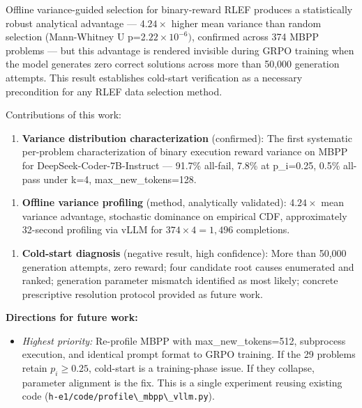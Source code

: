 
Offline variance-guided selection for binary-reward RLEF produces a statistically robust analytical advantage --- 4.$24\times$ higher mean variance than random selection (Mann-Whitney U p=2.$22\times 10^{-6})$, confirmed across 374 MBPP problems --- but this advantage is rendered invisible during GRPO training when the model generates zero correct solutions across more than 50,000 generation attempts. This result establishes cold-start verification as a necessary precondition for any RLEF data selection method.

Contributions of this work:

\begin{enumerate}
\item \textbf{Variance distribution characterization} (confirmed): The first systematic per-problem characterization of binary execution reward variance on MBPP for DeepSeek-Coder-7B-Instruct --- 91.7\% all-fail, 7.8\% at p\_i=0.25, 0.5\% all-pass under k=4, max\_new\_tokens=128.
\end{enumerate}

\begin{enumerate}
\item \textbf{Offline variance profiling} (method, analytically validated): 4.$24\times$ mean variance advantage, stochastic dominance on empirical CDF, approximately 32-second profiling via vLLM for $374\times 4=1,496$ completions.
\end{enumerate}

\begin{enumerate}
\item \textbf{Cold-start diagnosis} (negative result, high confidence): More than 50,000 generation attempts, zero reward; four candidate root causes enumerated and ranked; generation parameter mismatch identified as most likely; concrete prescriptive resolution protocol provided as future work.
\end{enumerate}

\textbf{Directions for future work:}

\begin{itemize}
\item \textit{Highest priority:} Re-profile MBPP with max\_new\_tokens=512, subprocess execution, and identical prompt format to GRPO training. If the 29 problems retain $p_i\geq 0.25$, cold-start is a training-phase issue. If they collapse, parameter alignment is the fix. This is a single experiment reusing existing code (\texttt{h-e1/code/profile\textbackslash \_mbpp\textbackslash \_vllm.py}).
\end{itemize}


